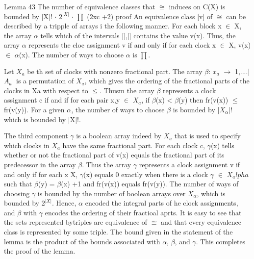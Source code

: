 Lemma 43
The number of equivalence classes that $\cong$ induces on C(X) is bounded by
|X|! $\cdot$ $2^{|X|}$ $\cdot$ $\prod$ (2xc +2)
proof
An equivalence class [v] of $\cong$ can be described by a tripple	 of arrays i the following manner. For each block x $\in$ X, the array $\alpha$ tells which of the intervals {[],[]}
contains the value v(x). Thus, the array $\alpha$ represents the cloc assignment v if and only if for each clock x $\in$ X, v(x)$\in$ $\alpha$(x). The number of ways to choose $\alpha$ is $\prod$.


Let $X_a$ be th set of clocks with nonzero fractional part. The array $\beta$: $x_a$ $\rightarrow$ {1,....|$A_a$|} is a permutation of $X_a$, which gives the ordering of the fractional parts of the clocks in Xa with respect to $\leq$. Thusm the array $\beta$ represents a clock assignment c if and if for each pair x,y $\in$ $X_a$, if $\beta$(x) < $\beta$(y) then fr(v(x)) $\leq$ fr(v(y)). For a given $\alpha$, the number of ways to choose $\beta$ is bounded by |$X_\alpha$|!  which is bounded by |X|!. \\ \newline

The third component  $\gamma$ is a boolean array indeed by $X_a$ that is used to specify which clocks in $X_a$ have the same fractional part. For each clock c, $\gamma$(x) tells whether or not the fractional part of v(x) equals  the fractional part of its predecessor in the array $\beta$. Thus the array $\gamma$ represents a clock assignment v if and only if for each x \n X, $\gamma$(x) equals 0 exactly when there is a clock $\gamma$ $\in$ $X_alpha$ such that $\beta$(y) = $\beta$(x) +1 and fr(v(x)) equals fr(v(y)). The number of ways of choosing $\gamma$ is bounded by the number of boolean arrays over $X_\alpha$, which is bounded by $2^{|X|}$.
Hence, $\alpha$ encoded the integral parts of he clock assignments, and $\beta$ with $\gamma$ encodes the ordering of their fractioal aprts. It is easy to see that the sets represented bytriples are equivalence of $\cong$ and that every equivalence class is represented by some triple. The bound given in the statement of the lemma is the product of the bounds associated with $\alpha$, $\beta$, and $\gamma$. This completes the proof of the lemma. \\ \newline


